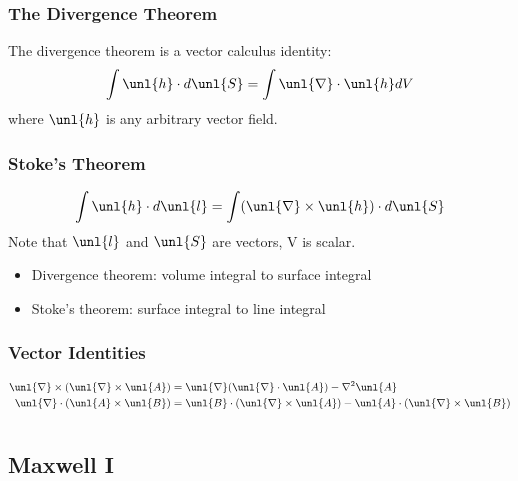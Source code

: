 \documentclass[a4paper, 11pt, normalem]{report}
\newcommand\del{\unl{\nabla}}
\begin{document}
\subsection{The Divergence Theorem}
The divergence theorem is a vector calculus identity:
\begin{equation*}
    \int \unl{h}\cdot d\unl{S} = \int \del \cdot \unl{h}dV
\end{equation*}
where $\unl{h}$ is any arbitrary vector field.

\subsection{Stoke's Theorem}
\begin{equation*}
    \int \unl{h}\cdot d\unl{l} = \int (\del \times \unl{h}) \cdot d\unl{S}
\end{equation*}
Note that $\unl{l}$ and $\unl{S}$ are vectors, V is scalar.
\begin{itemize}
    \item Divergence theorem: volume integral to surface integral
    \item Stoke's theorem: surface integral to line integral
\end{itemize}

\subsection{Vector Identities}
\begin{align*}
    \del \times (\del \times \unl{A}) &= \del(\del \cdot \unl{A}) - \nabla^2 \unl{A} \\
    \del \cdot (\unl{A} \times \unl{B}) &= \unl{B}\cdot(\del \times \unl{A}) - \unl{A} \cdot (\del \times \unl{B})
\end{align*}

\chapter{}
\section{Maxwell \RN{1}}
\end{document}
